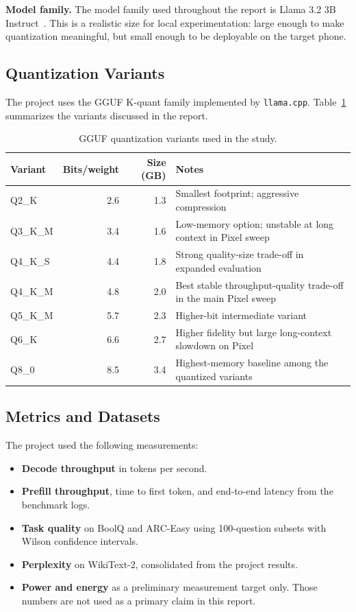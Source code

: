 \documentclass{article}
\begin{document}
\textbf{Model family.} The model family used throughout the report is Llama 3.2 3B Instruct~\cite{llama3}. This is a realistic size for local experimentation: large enough to make quantization meaningful, but small enough to be deployable on the target phone.

\subsection{Quantization Variants}

The project uses the GGUF K-quant family implemented by \texttt{llama.cpp}. Table~\ref{tab:variants} summarizes the variants discussed in the report.

\begin{table}[t]
\centering
\caption{GGUF quantization variants used in the study.}
\label{tab:variants}
\small
\begin{tabular}{lrrp{5.4cm}}
\toprule
\textbf{Variant} & \textbf{Bits/weight} & \textbf{Size (GB)} & \textbf{Notes} \\
\midrule
Q2\_K    & 2.6 & 1.3 & Smallest footprint; aggressive compression \\
Q3\_K\_M & 3.4 & 1.6 & Low-memory option; unstable at long context in Pixel sweep \\
Q4\_K\_S & 4.4 & 1.8 & Strong quality-size trade-off in expanded evaluation \\
Q4\_K\_M & 4.8 & 2.0 & Best stable throughput-quality trade-off in the main Pixel sweep \\
Q5\_K\_M & 5.7 & 2.3 & Higher-bit intermediate variant \\
Q6\_K    & 6.6 & 2.7 & Higher fidelity but large long-context slowdown on Pixel \\
Q8\_0    & 8.5 & 3.4 & Highest-memory baseline among the quantized variants \\
\bottomrule
\end{tabular}
\end{table}

\subsection{Metrics and Datasets}

The project used the following measurements:
\begin{itemize}
  \item \textbf{Decode throughput} in tokens per second.
  \item \textbf{Prefill throughput}, time to first token, and end-to-end latency from the benchmark logs.
  \item \textbf{Task quality} on BoolQ and ARC-Easy using 100-question subsets with Wilson confidence intervals.
  \item \textbf{Perplexity} on WikiText-2, consolidated from the project results.
  \item \textbf{Power and energy} as a preliminary measurement target only. Those numbers are not used as a primary claim in this report.
\end{itemize}
\end{document}
